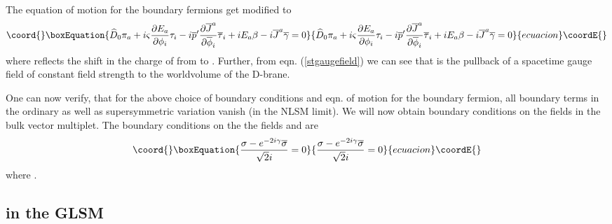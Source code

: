 \documentclass[a4paper,12pt]{article}
\begin{document}
The equation of motion for the boundary fermions get modified to
\begin{equation}\coord{}\boxEquation{
\widehat{D}_0 \pi_a 
+ i \varsigma{{\partial E_a}\over{\partial\phi_i}} \tau_i
-i \overline{p}'{{\partial \overline{J}^a}\over{\partial\overline{\phi}_i}}
\overline{\tau}_i+iE_a \beta   
-i \overline{J}^a \overline{\gamma} =0
}{
\widehat{D}_0 \pi_a 
+ i \varsigma{{\partial E_a}\over{\partial\phi_i}} \tau_i
-i \overline{p}'{{\partial \overline{J}^a}\over{\partial\overline{\phi}_i}}
\overline{\tau}_i+iE_a \beta   
-i \overline{J}^a \overline{\gamma} =0
}{ecuacion}\coordE{}\end{equation} \label{pieqn}
where \coordHE{} 
reflects the  shift in the charge of \coordHE{} from \coordHE{} to
\myHighlight{$[{\theta\over{2\pi}}]$}\coordHE{}. Further, from eqn. (\ref{stgaugefield}) we can see
that \coordHE{} is the pullback of a spacetime  \coordHE{} gauge field of
constant field strength to the worldvolume of the  D-brane.

One can now verify, that  for the above choice of boundary conditions
and eqn. of motion for the boundary fermion, all boundary terms in the
ordinary as well as supersymmetric variation vanish (in the NLSM limit).
We will now obtain boundary conditions on the fields in the bulk vector
multiplet. The boundary conditions on the the fields \myHighlight{$\sigma$}\coordHE{} and
\myHighlight{$\overline{\sigma}$}\coordHE{} are
\begin{equation}\coord{}\boxEquation{
{{\sigma - e^{-2i\gamma} \overline{\sigma}}\over{\sqrt2 i}} 
=0
}{
{{\sigma - e^{-2i\gamma} \overline{\sigma}}\over{\sqrt2 i}} 
=0
}{ecuacion}\coordE{}\end{equation}
where \coordHE{}.

\subsection{\coordHE{} in the GLSM}
\end{document}
